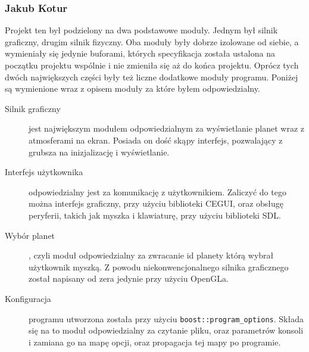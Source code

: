 \subsubsection{Jakub Kotur}\label{ssub:jakub kotur}

Projekt ten był podzielony na dwa podstawowe moduły. Jednym był silnik graficzny, drugim silnik fizyczny. Oba moduły były dobrze izolowane od siebie, a wymieniały się jedynie buforami, których specyfikacja została ustalona na początku projektu wspólnie i nie zmieniła się aż do końca projektu. Oprócz tych dwóch największych części były też liczne dodatkowe moduły programu. Poniżej są wymienione wraz z opisem moduły za które byłem odpowiedzialny.

\begin{description}
\item[Silnik graficzny] jest największym modułem odpowiedzialnym za wyświetlanie planet wraz z atmosferami na ekran. Posiada on dość skąpy interfejs, pozwalający z grubsza na inizjalizację i wyświetlanie.
\item[Interfejs użytkownika] odpowiedzialny jest za komunikację z użytkownikiem. Zaliczyć do tego można interfejs graficzny, przy użyciu biblioteki CEGUI, oraz obsługę peryferii, takich jak myszka i klawiaturę, przy użyciu biblioteki SDL.
\item[Wybór planet], czyli moduł odpowiedzialny za zwracanie id planety którą wybrał użytkownik myszką. Z powodu niekonwencjonalnego silnika graficznego został napisany od zera jedynie przy użyciu OpenGLa.
\item[Konfiguracja] programu utworzona została przy użyciu \texttt{boost::program\_options}. Składa się na to moduł odpowiedzialny za czytanie pliku, oraz parametrów konsoli i zamiana go na mapę opcji, oraz propagacja tej mapy po programie.
\end{description}

